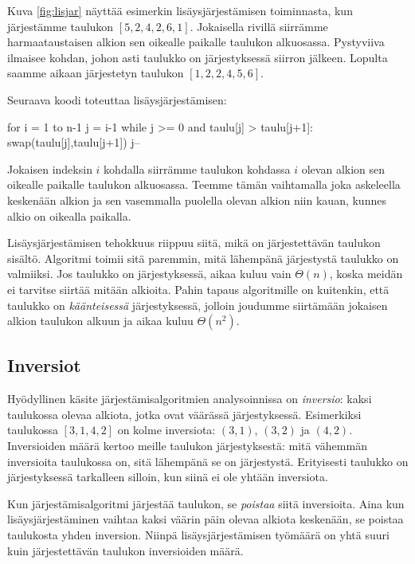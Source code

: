 Kuva \ref{fig:lisjar} näyttää esimerkin lisäysjärjestämisen
toiminnasta, kun järjes\-tämme taulukon $[5,2,4,2,6,1]$.
Jokaisella rivillä siirrämme harmaataustaisen alkion
sen oikealle paikalle taulukon alkuosassa.
Pystyviiva ilmaisee kohdan, johon asti taulukko on järjestyksessä
siirron jälkeen.
Lopulta saamme aikaan järjestetyn taulukon $[1,2,2,4,5,6]$.

Seuraava koodi toteuttaa lisäysjärjestämisen:

\begin{code}
for i = 1 to n-1
    j = i-1
    while j >= 0 and taulu[j] > taulu[j+1]:
        swap(taulu[j],taulu[j+1])
        j--
\end{code}

Jokaisen indeksin $i$ kohdalla siirrämme taulukon
kohdassa $i$ olevan alkion sen oikealle paikalle
taulukon alkuosassa.
Teemme tämän vaihtamalla joka askeleella keskenään
alkion ja sen vasemmalla puolella olevan alkion
niin kauan, kunnes alkio on oikealla paikalla.

Lisäysjärjestämisen tehokkuus riippuu siitä,
mikä on järjestettävän taulukon sisältö.
Algoritmi toimii sitä paremmin, mitä lähempänä järjestystä
taulukko on valmiiksi.
Jos taulukko on järjestyksessä,
aikaa kuluu vain $\Theta(n)$, koska meidän ei tarvitse siirtää
mitään alkioita.
Pahin tapaus algoritmille on kuitenkin, että taulukko on
\emph{käänteisessä} järjestyksessä,
jolloin joudumme siirtämään jokaisen alkion
taulukon alkuun ja aikaa kuluu $\Theta(n^2)$.

\subsection{Inversiot}

Hyödyllinen käsite järjestämisalgoritmien analysoinnissa
on \emph{inversio}: kaksi taulukossa olevaa alkiota,
jotka ovat väärässä järjestyksessä.
Esimerkiksi taulukossa $[3,1,4,2]$ on kolme inversiota:
$(3,1)$, $(3,2)$ ja $(4,2)$.
Inversioiden määrä kertoo meille taulukon järjestyksestä:
mitä vähemmän inversioita taulukossa on,
sitä lähempänä se on järjestystä.
Erityisesti taulukko on järjestyksessä tarkalleen silloin,
kun siinä ei ole yhtään inversiota.

Kun järjestämisalgoritmi järjestää taulukon,
se \emph{poistaa} siitä inversioita.
Aina kun lisäysjärjestäminen vaihtaa kaksi
väärin päin olevaa alkiota keskenään,
se poistaa taulukosta yhden inversion.
Niinpä lisäysjärjestämisen työmäärä on yhtä suuri
kuin järjestettävän taulukon inversioiden määrä.

